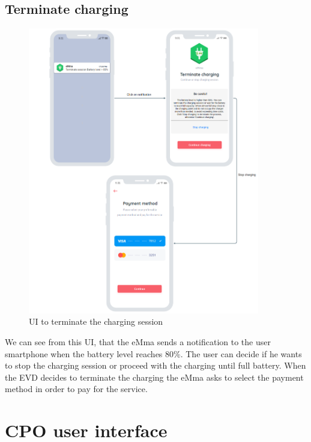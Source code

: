 \subsection{Terminate charging}
\begin{figure}[H]
    \centering
    \includegraphics[width=0.9\textwidth]{Images/cp3/terminateCharging.png}
    \caption{UI to terminate the charging session}
\end{figure}
We can see from this UI, that the eMma sends a notification to the user smartphone when the battery level reaches 80\%. The user can decide if he wants to stop the charging session or proceed with the charging until full battery. When the EVD decides to terminate the charging the eMma asks to select the payment method in order to pay for the service.

\clearpage
\section{CPO user interface}
